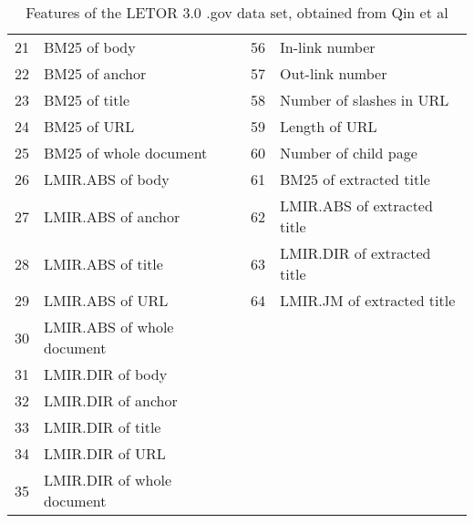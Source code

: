 \begin{table}
{\begin{tabular}{p{0.29cm}|p{7.26cm}||p{0.29cm}|p{9.55cm}}
21& BM25 of body					& 56& In-link number\\
22& BM25 of anchor					& 57& Out-link number\\
23& BM25 of title					& 58& Number of slashes in \acs{URL}\\
24& BM25 of \acs{URL}				& 59& Length of \acs{URL}\\
25& BM25 of whole document			& 60& Number of child page\\

26& LMIR.ABS \cite{Zhai2001} of body	& 61& BM25 of extracted title\\
27& LMIR.ABS of anchor				& 62& LMIR.ABS of extracted title\\
28& LMIR.ABS of title				& 63& LMIR.DIR of extracted title\\
29& LMIR.ABS of \acs{URL}			& 64& LMIR.JM of extracted title\\
30& LMIR.ABS of whole document\\

31& LMIR.DIR of body\\
32& LMIR.DIR of anchor\\
33& LMIR.DIR of title\\
34& LMIR.DIR of \acs{URL}\\
35& LMIR.DIR of whole document\\
\end{tabular}
}
\caption{Features of the LETOR 3.0 .gov data set, obtained from Qin et al \cite{Qin2010}}
\label{tbl:features_gov}
\end{table}

